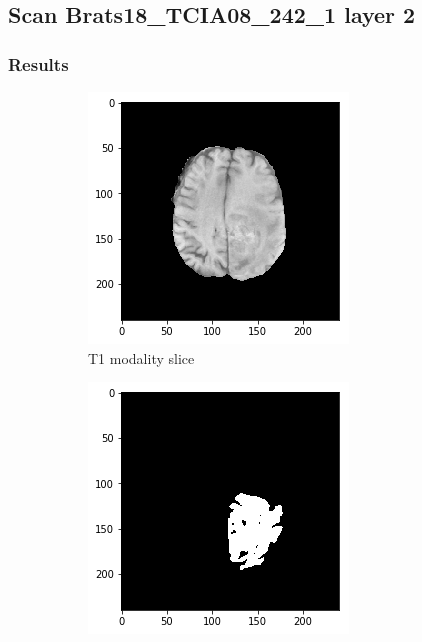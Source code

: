 \subsection{Scan Brats18\_TCIA08\_242\_1 layer 2}
\subsubsection{Results}


\begin{figure}[H]
    \centering
    \begin{subfigure}[t]{.21\textwidth}
        \centering
        \includegraphics[width=\linewidth]{chapters/06_hdm/b_Brats18_TCIA08_242_1_L2/21.png}
        \caption{T1 modality slice}
    \end{subfigure}%
    \begin{subfigure}[t]{.21\textwidth}
        \centering
        \includegraphics[width=\linewidth]{chapters/06_hdm/b_Brats18_TCIA08_242_1_L2/20.png}

\end{subfigure}
\end{figure}

